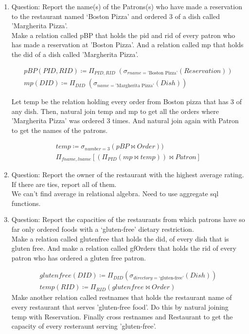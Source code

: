 \documentclass{article}
\begin{document}
\begin{enumerate}
    \item %
         Question: Report the name(s) of the Patrons(s) who have made a reservation to the restaurant
named ‘Boston Pizza’ and ordered 3 of a dish called ’Margherita Pizza’.\\

Make a relation called pBP that holds the pid and rid of every patron who has made a reservation at 'Boston Pizza'. 
And a relation called mp that holds the did of a dish called ’Margherita Pizza’.

\begin{align}
       pBP(PID,RID) \coloneqq \Pi_{PID, RID}\;(\sigma_{rname = \text{'Boston Pizza'}}(Reservation))\\
        mp(DID) \coloneqq \Pi_{DID}\;(\sigma_{name = \text{’Margherita Pizza’}}(Dish))
		\end{align} 
		
		Let temp be the relation holding every order from Boston pizza that has 3 of any dish. Then, natural join temp and mp to get all the orders where ’Margherita Pizza’ was ordered 3 times. And natural join again with Patron to  get the names of the patrons. 
		
\begin{align}
       temp \coloneqq \sigma_{number = 3}(pBP \bowtie Order))\\
       \Pi_{fname, lname}[(\Pi_{PID} (mp \bowtie temp)) \bowtie Patron]
		\end{align} 

\item %
Question: Report the owner of the restaurant with the highest average rating. If there are ties, report all of them.\\

We can't find average in relational algebra. Need to use aggregate sql functions.

\item %
Question: Report the capacities of the restaurants from which patrons have so far only ordered foods with a
‘gluten-free’ dietary restriction.\\	

Make a relation called glutenfree that holds the did, of every dish that is gluten free. And make a relation called gfOrders that holds the rid of every patron who has ordered a gluten free patron.
		
		\begin{align}
        glutenfree(DID) \coloneqq \Pi_{DID} (\sigma_{directory = \text{‘gluten-free’}}(Dish))\\
        temp(RID) \coloneqq \Pi_{RID} (glutenfree \bowtie Order)
		\end{align} 
	Make another relation called restnames that holds the restaurant name of every restaurant that serves 'gluten-free food'. Do this by natural joining temp with Reservation. 
	Finally cross restnames and Restaurant to get the capacity of every resteraunt serving 'gluten-free'.
	

\end{enumerate}
\end{document}
